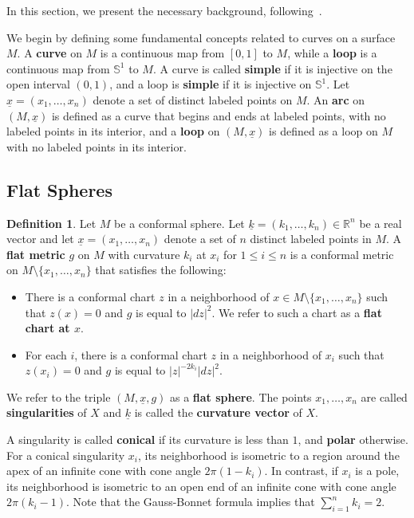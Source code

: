 \documentclass{compositio}
\numberwithin{equation}{section}
\numberwithin{figure}{section}
\theoremstyle{definition}
\newtheorem{definition}{Definition}[section]
\theoremstyle{plain}
\begin{document}
{In this section, we present the necessary background, following~\cite{Veech, thu, fu2024uniformlengthestimatestrajectories}. 

We begin by defining some fundamental concepts related to curves on a surface $M$. A \textbf{curve} on $M$ is a continuous map from $[0,1]$ to $M$, while a \textbf{loop} is a continuous map from $\mathbb{S}^1$ to $M$. A curve is called \textbf{simple} if it is injective on the open interval $(0,1)$, and a loop is \textbf{simple} if it is injective on $\mathbb{S}^1$. Let $\underline{x} = (x_1, \ldots, x_n)$ denote a set of distinct labeled points on $M$. An \textbf{arc} on $(M, \underline{x})$ is defined as a curve that begins and ends at labeled points, with no labeled points in its interior, and a \textbf{loop} on $(M, \underline{x})$ is defined as a loop on $M$ with no labeled points in its interior.

\subsection{Flat Spheres}
\begin{definition}\label{def:flatspheres}
Let $M$ be a conformal sphere. Let $\underline{k}=(k_1, \ldots, k_n) \in \mathbb{R}^n$ be a real vector and let $\underline{x}=(x_1, \ldots, x_n)$ denote a set of $n$ distinct labeled points in $M$. A \textbf{flat metric} $g$ on $M$ with curvature $k_i$ at $x_i$ for $1\le i\le n$ is a conformal metric on $M\setminus\{x_1,\ldots,x_n\}$ that satisfies the following:
\begin{itemize}
    \item There is a conformal chart $z$ in a neighborhood of $x\in M\setminus\{x_1,\ldots,x_n\}$ such that $z(x)=0$ and $g$ is equal to $|dz|^2$. We refer to such a chart as a \textbf{flat chart at $x$}.
    \item For each $i$, there is a conformal chart $z$ in a neighborhood of $x_i$ such that $z(x_i) = 0$ and $g$ is equal to $|z|^{-2k_i}|dz|^2$.
\end{itemize}
We refer to the triple $(M, \underline{x}, g)$ as a \textbf{flat sphere}. The points $x_1, \ldots, x_n$ are called \textbf{singularities} of $X$ and $\underline{k}$ is called the \textbf{curvature vector} of $X$.
\end{definition}
A singularity is called \textbf{conical} if its curvature is less than $1$, and \textbf{polar} otherwise. For a conical singularity $x_i$, its neighborhood is isometric to a region around the apex of an infinite cone with cone angle $2\pi(1 - k_i)$. In contrast, if $x_i$ is a pole, its neighborhood is isometric to an open end of an infinite cone with cone angle $2\pi(k_i - 1)$. Note that the Gauss-Bonnet formula implies that $\sum_{i=1}^{n} k_i = 2$.

}
\end{document}
